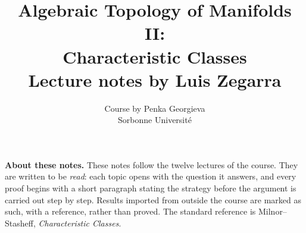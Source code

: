 \documentclass[11pt,a4paper]{report}
\title{\textbf{Algebraic Topology of Manifolds II:\\ Characteristic Classes}\\[1em]
\large Lecture notes by Luis Zegarra}
\author{Course by Penka Georgieva\\ Sorbonne Universit\'e}
\date{}
\theoremstyle{plain}
\theoremstyle{definition}
\theoremstyle{remark}
\begin{document}
\maketitle

\noindent\textbf{About these notes.}
These notes follow the twelve lectures of the course. They are written to be
\emph{read}: each topic opens with the question it answers, and every proof
begins with a short paragraph stating the strategy before the argument is
carried out step by step. Results imported from outside the course are marked
as such, with a reference, rather than proved. The standard reference is
Milnor--Stasheff, \emph{Characteristic Classes}.

\vspace{1em}

\tableofcontents













\end{document}
